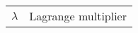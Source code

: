 \begin{scriptsize}
\begin{tabularx}{\textwidth}{r|X}
$\lambda$                   & Lagrange multiplier\\

\end{tabularx}
\end{scriptsize} 